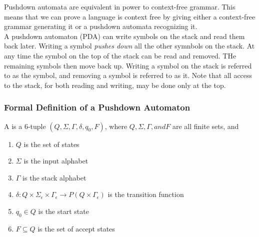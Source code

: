 \documentclass{article}
\begin{document}
Pushdown automata are equivalent in power to context-free grammar. This means that we can prove a language is context free by giving either a context-free grammar generating it or a pushdown automata recognizing it. \\ 

A pushdown automaton (PDA) can write symbols on the stack and read them back later. Writing a symbol \emph{pushes down} all the other symnbols on the stack. At any time the symbol on the top of the stack can be read and removed. THe remaining symbols then move back up. Writing a symbol on the stack is referred to as  the symbol, and removing a symbol is referred to as  it. Note that all access to the stack, for both reading and writing, may be done only at the top. \\ 

\subsubsection{Formal Definition of a Pushdown Automaton}

\begin{definition}
  A  is a 6-tuple $(Q, \Sigma, \Gamma, \delta, q_0 , F)$, where $Q, \Sigma, \Gamma, and F$ are all finite sets, and 
  \begin{enumerate}
    \item $Q$ is the set of states 
    \item $\Sigma$ is the input alphabet 
    \item $\Gamma$ is the stack alphabet 
    \item $\delta: Q \times \Sigma_{\epsilon} \times \Gamma_{\epsilon} \rightarrow P(Q \times \Gamma_{\epsilon})$ is the transition function 
    \item $q_0 \in Q$ is the start state 
    \item $F \subseteq Q$ is the set of accept states
  \end{enumerate}
\end{definition}
\end{document}
